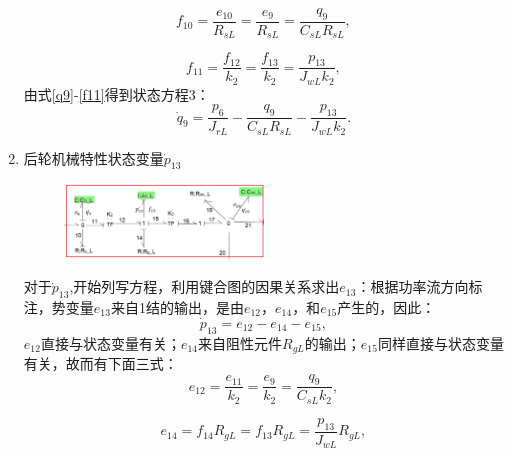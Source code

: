 \begin{enumerate}
\begin{equation}
f _ { 10 } = \frac { e _ { 10 } } { R _ { sL}  } = \frac { e _ { 9 } } { R _ { sL }  } = \frac { q _ { 9 } } { C _ { s L}  R _ { s  L } } ,
\end{equation}

\begin{equation}\label{f11}
f _ { 11 } = \frac { f _ { 12 } } { k _ { 2 } } = \frac { f _ { 13 } } { k _ { 2 } } = \frac { p _ { 13 } } { J _ { wL}  k _ { 2 } },
\end{equation}
由式\ref{q9}-\ref{f11}得到状态方程3：
\begin{equation}
\dot{ q } _ { 9 } = \frac { p _ { 6 } } { J _ { rL } } - \frac { q _ { 9 } } { C _ { sL }  R _ { s L}  } - \frac { p _ { 13 } } { J _ { w L }  k _ { 2 } }.
\end{equation}

\item{后轮机械特性状态变量$\dot{ p}_{13} $}
\begin{figure}[H]
	\centering
	\includegraphics[width=0.5\textwidth]{fig/equation4.png}
	\caption{}\label{fig:equation4}
\end{figure}
对于$\dot{p} _ { 13 }$,开始列写方程，利用键合图的因果关系求出$e_{13}$：根据功率流方向标注，势变量$e_{13}$来自1结的输出，是由$e_{12}$，$e_{14}$，和$e_{15}$产生的，因此：
\begin{equation}\label{p13}
\dot{ p } _ { 13 } = e _ { 12 } - e _ { 14 } - e _ { 15 },
\end{equation}
$e_{12}$直接与状态变量有关；$e_{14}$来自阻性元件$R _ { gL }$的输出；$e_{15}$同样直接与状态变量有关，故而有下面三式：
\begin{equation}
e _ { 12 } = \frac { e _ { 11 } } { k _ { 2 } } = \frac { e _ { 9 } } { k _ { 2 } } = \frac { q _ { 9 } } { C _ { sL  } k _ { 2 } },
\end{equation}

\begin{equation}
e _ { 14 } = f _ { 14 } R _ { gL}  = f _ { 13 } R _ { gL}  = \frac { p _ { 13 } } { J _ { wL}  } R _ { gL } ,
\end{equation}


\end{enumerate}
